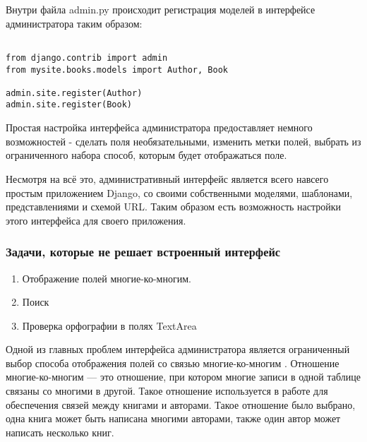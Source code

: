 Внутри файла admin.py происходит регистрация моделей в интерфейсе администратора таким образом: 

{
\small \begin{verbatim}

from django.contrib import admin
from mysite.books.models import Author, Book

admin.site.register(Author)
admin.site.register(Book)

\end{verbatim}
}

Простая настройка интерфейса администратора предоставляет немного возможностей - сделать поля необязательными, изменить метки полей, выбрать из ограниченного набора способ, которым будет отображаться поле.

Несмотря на всё это, административный интерфейс является всего навсего простым приложением Django, со своими собственными моделями, шаблонами, представлениями и схемой URL. Таким образом есть возможность настройки этого интерфейса для своего приложения.

\subsubsection{Задачи, которые не решает встроенный интерфейс}
\begin{enumerate}
	\item Отображение полей многие-ко-многим.
	\item Поиск
	\item Проверка орфографии в полях TextArea
\end{enumerate}

Одной из главных проблем интерфейса администратора является ограниченный выбор способа отображения полей со связью многие-ко-многим \cite{many-to-many}. Отношение многие-ко-многим  --- это отношение, при котором многие записи в одной таблице связаны со многими в другой. Такое отношение используется в работе для обеспечения связей между книгами и авторами. Такое отношение было выбрано, \tk одна книга может быть написана многими авторами, также один автор может написать несколько книг. 


